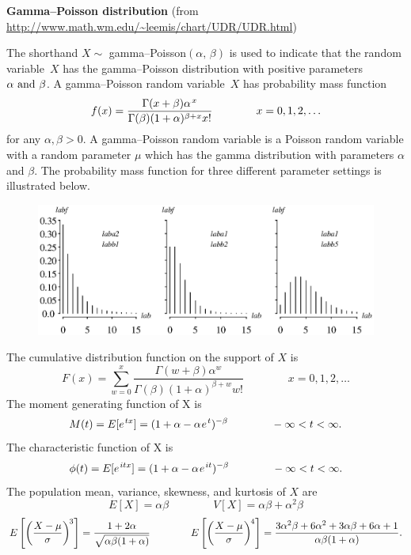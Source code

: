 \documentclass[12pt,fullpage]{article}
\begin{document}
\noindent
{\bf Gamma--Poisson distribution} (from \color{blue}\url{http://www.math.wm.edu/~leemis/chart/UDR/UDR.html}\color{black})

\noindent
The shorthand $X \sim$ gamma--Poisson$(\alpha,\, \beta)$ is used to indicate that the
random variable~$X$ has the gamma--Poisson distribution with positive parameters $\alpha\  {\rm and}\  \beta$.
A gamma--Poisson random variable~$X$ has probability mass function 
$$
f(x) = \frac{\Gamma(x + \beta)\alpha ^ {\kern 0.08 em x}}{\Gamma(\beta)(1 + \alpha) ^ {\beta + x} x !} \qquad \qquad x = 0, 1, 2, \ldots
$$
for any $\alpha, \beta > 0$.
A gamma--Poisson random variable is a Poisson random variable with a random parameter $\mu$ which has the
gamma distribution with parameters $\alpha$ and $\beta$.
The probability mass function for three different parameter settings is illustrated below. \\

\begin{figure}[h!]
\begin{center}
\includegraphics[width=5.6in]{GammapoissonPlot.ps}
\end{center}
\end{figure}

\noindent
The cumulative distribution function on
the support of $X$ is
$$
F(x) = \sum_{w = 0} ^ x \frac{\Gamma (w + \beta)\alpha^ {w}}{\Gamma (\beta)(1 + \alpha)^{\beta + w} w !} \qquad \qquad x = 0, 1, 2, \ldots
$$
The moment generating function of X is
$$
M(t) = E[e^{\kern 0.08 em tx}] = (1 + \alpha - \alpha \kern 0.08 em e ^ {\kern 0.08 em t}) ^ {-\beta} \qquad \qquad -\infty < t < \infty. 
$$
The characteristic function of X is
$$
\phi(t) = E[e ^ {\kern 0.08 em i tx}] = (1 + \alpha - \alpha \kern 0.08 em  e ^ {\kern 0.08 em it}) ^ {-\beta} \qquad \qquad -\infty < t < \infty. 
$$
The population mean, variance, skewness, and kurtosis of $X$ are
$$
E[X] = \alpha \beta \qquad \qquad
V[X] = \alpha  \beta + \alpha ^ 2 \beta 
$$
$$
E\left[ \left( \frac{X - \mu} {\sigma} \right) ^ {\kern -0.08 em 3} \right] = \frac{1 + 2\alpha} {\sqrt{\alpha \beta (1 + \alpha)}} \qquad \qquad
E\left[ \left( \frac{X - \mu}{\sigma} \right) ^ {\kern -0.08 em 4} \right] = \frac{3 \alpha ^ 2 \beta + 6 \alpha ^ 2 + 3 \alpha \beta + 6 \alpha + 1}{\alpha \beta (1 + \alpha)}.
$$
\end{document}
